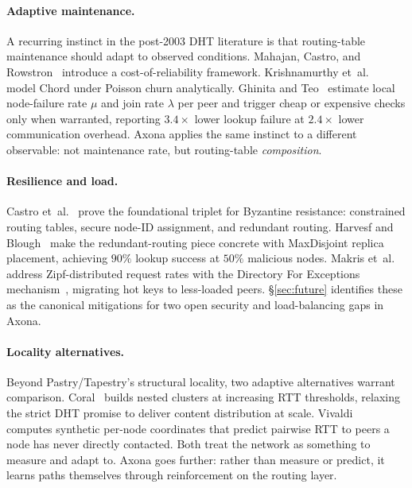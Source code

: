 \documentclass[conference]{IEEEtran}
\newcommand{\axona}{Axona\xspace}
\begin{document}
\paragraph{Adaptive maintenance.}
A recurring instinct in the post-2003 DHT literature is that
routing-table maintenance should adapt to observed conditions.
Mahajan, Castro, and Rowstron~\cite{mahajan2003controlling}
introduce a cost-of-reliability framework.
Krishnamurthy et~al.~\cite{krishnamurthy2005statistical} model
Chord under Poisson churn analytically.  Ghinita and
Teo~\cite{ghinita2006adaptive} estimate local node-failure rate
$\mu$ and join rate $\lambda$ per peer and trigger cheap or
expensive checks only when warranted, reporting $3.4\times$
lower lookup failure at $2.4\times$ lower communication overhead.
\axona applies the same instinct to a different observable: not
maintenance rate, but routing-table \emph{composition}.

\paragraph{Resilience and load.}
Castro et~al.~\cite{castro2002secure} prove the foundational
triplet for Byzantine resistance: constrained routing tables,
secure node-ID assignment, and redundant routing.  Harvesf and
Blough~\cite{harvesf2007design} make the redundant-routing piece
concrete with MaxDisjoint replica placement, achieving $90\%$
lookup success at $50\%$ malicious nodes.  Makris
et~al.~\cite{makris2017novel} address Zipf-distributed request
rates with the Directory For Exceptions
mechanism~\cite{karger1997consistent}, migrating hot keys to
less-loaded peers.  \S\ref{sec:future} identifies these as the
canonical mitigations for two open security and load-balancing
gaps in \axona.

\paragraph{Locality alternatives.}
Beyond Pastry/Tapestry's structural locality, two adaptive
alternatives warrant comparison.  Coral~\cite{freedman2004coral}
builds nested clusters at increasing RTT thresholds, relaxing
the strict DHT promise to deliver content distribution at
scale.  Vivaldi~\cite{dabek2004vivaldi} computes synthetic
per-node coordinates that predict pairwise RTT to peers a node
has never directly contacted.  Both treat the network as
something to measure and adapt to.  \axona goes further: rather
than measure or predict, it learns paths themselves through
reinforcement on the routing layer.
\end{document}
